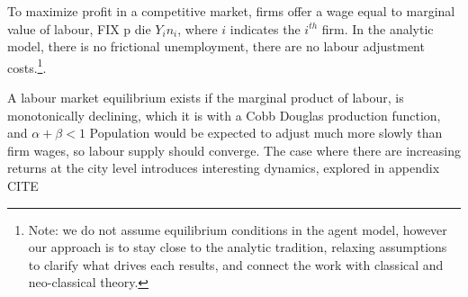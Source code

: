 To maximize profit 
in a competitive market, firms offer a wage equal to marginal value of labour, 
FIX p die ${Y_i}{n_i}$, where $i$ indicates the $i^{th}$ firm. In the analytic model, there is no frictional unemployment, there are no labour adjustment costs.\footnote{Note: we do not assume equilibrium conditions in the agent model, however our approach is to stay close to the analytic tradition, relaxing assumptions to clarify what drives each results, and connect the work with classical and neo-classical theory.}. %

A labour market equilibrium exists if the marginal product of labour, is monotonically declining, which it is with a Cobb Douglas production function, and $\alpha + \beta<1$ 
Population would be expected to adjust much more slowly than firm wages, so labour supply should converge. The case where there are increasing returns at the city level introduces interesting dynamics, explored in appendix CITE %

